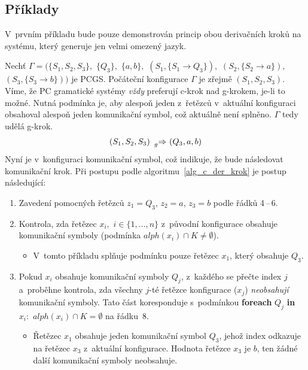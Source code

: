 \subsection*{Příklady}
V~prvním příkladu bude pouze demonstrován princip obou derivačních kroků na systému, který generuje jen velmi omezený jazyk.
\begin{example}
    Nechť $\Gamma = (\{S_1, S_2, S_3\},$ $\{Q_3\},$ $\{a, b\},$ $(S_1, \{S_1 \rightarrow Q_3\}),$ $(S_2, \{S_2 \rightarrow a\}),$ $(S_3, \{S_3 \rightarrow b\}))$ je PCGS.
    Počáteční konfigurace $\Gamma$ je zřejmě $(S_1, S_2, S_3)$.
    Víme, že PC gramatické systémy \emph{vždy} preferují c-krok nad g-krokem, je-li to možné.
    Nutná podmínka je, aby alespoň jeden z~řetězců v~aktuální konfiguraci obsahoval alespoň jeden komunikační symbol, což aktuálně není splněno.
    $\Gamma$ tedy udělá g-krok.
     \begin{equation*}
    (S_1, S_2, S_3) \ \prescript{}{g}{\Rightarrow} \ (Q_3, a, b)
     \end{equation*}
     Nyní je v~konfiguraci komunikační symbol, což indikuje, že bude následovat komunikační krok.
     Při postupu podle algoritmu~\ref{alg_c_der_krok} je postup následující:
     \begin{enumerate}
        \item Zavedení pomocných řetězců $z_1 = Q_3$, $z_2 = a$, $z_3 = b$ podle řádků 4\,--\,6.
        \item Kontrola, zda řetězec $x_i,$ $i \in \{1, \ldots, n\}$ z~původní konfigurace obsahuje komunikační symboly (podmínka $alph(x_i) \cap K \neq \emptyset$).
        \begin{itemize}[label=$\circ$]
            \item V~tomto příkladu splňuje podmínku pouze řetězec $x_1$, který obsahuje $Q_3$.
        \end{itemize}
        \item Pokud $x_i$ obsahuje komunikační symboly $Q_j$, z~každého se přečte index $j$ a~proběhne kontrola, zda všechny $j$-té řetězce konfigurace ($x_j$) \emph{neobsahují} komunikační symboly.
        Tato část koresponduje s~podmínkou \textbf{foreach} $Q_j$ \textbf{in} $x_i:$ $alph(x_i) \cap K = \emptyset$ na řádku~8.
        \begin{itemize}[label=$\circ$]
            \item Řetězec $x_1$ obsahuje jeden komunikační symbol $Q_3$, jehož index odkazuje na řetězec $x_3$ z~aktuální konfigurace. Hodnota řetězce $x_3$ je $b$, ten žádné další komunikační symboly neobsahuje.

\end{itemize}
\end{enumerate}
\end{example}
